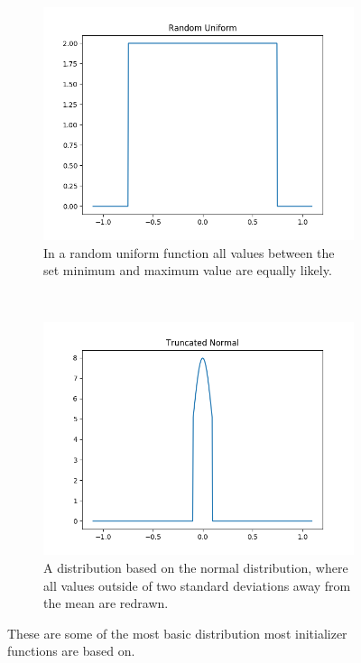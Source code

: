 \newpage

\begin{figure}[h!]
\centering
	\begin{subfigure}[t]{0.5\textwidth}
		\centering
		\includegraphics[width=\textwidth]{img/methodology_neuralNetwork_initializerFunctions_randomUniform.png}
		\caption{In a random uniform function all values between the set minimum and maximum value are equally likely.}
	\end{subfigure}%
	~ 
	\begin{subfigure}[t]{0.5\textwidth}
		\centering
		\includegraphics[width=\textwidth]{img/methodology_neuralNetwork_initializerFunctions_truncatedNormal.png}
		\caption{A distribution based on the normal distribution, where all values outside of two standard deviations away from the mean are redrawn.}
	\end{subfigure}
	\caption{These are some of the most basic distribution most initializer functions are based on.}
	\label{pic:methodology_neuralNetwork_initializerFunctions}
\end{figure}

